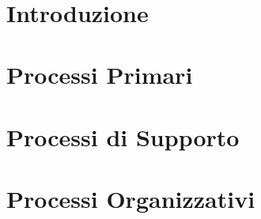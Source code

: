 \documentclass[12pt, a4paper,table]{article}
\title{\textsc{\docNome}}
\author{}
\date{}
\begin{document}


\tableofcontents
\newpage
\section{Introduzione}
    
\newpage
\section{Processi Primari} 
	
\newpage
\section{Processi di Supporto}
    
    
    
    	
    
    
\newpage
\section{Processi Organizzativi}
    
    
    
    
\end{document}
